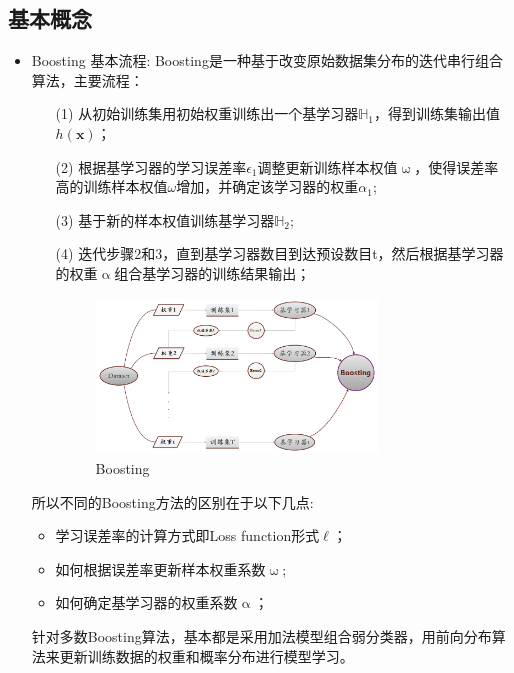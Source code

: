 \documentclass[a4paper]{article}
\begin{document}
	\subsection{基本概念}
	\begin{itemize}
		\item Boosting 基本流程:
		Boosting是一种基于改变原始数据集分布的迭代串行组合算法，主要流程：
			\begin{itemize}
				\item[(1)]	从初始训练集用初始权重训练出一个基学习器$\mathbb{H}_1$，得到训练集输出值$h(\textbf{x})$；
				\item[(2)]	根据基学习器的学习误差率$\epsilon_1$调整更新训练样本权值$\upomega$，使得误差率高的训练样本权值$\omega$增加，并确定该学习器的权重$\alpha_1$;
				\item[(3)]	基于新的样本权值训练基学习器$\mathbb{H}_2$;
				\item[(4)]	迭代步骤2和3，直到基学习器数目到达预设数目t，然后根据基学习器的权重$\upalpha$组合基学习器的训练结果输出；
				\begin{figure}[h]
					\centering
					\includegraphics[width=0.75\textwidth]{Dataset.png}
					\caption{Boosting}
				\end{figure}
			\end{itemize}
			所以不同的Boosting方法的区别在于以下几点:
			\begin{itemize}
				\item 学习误差率的计算方式即Loss function形式$\ell$；
				\item 如何根据误差率更新样本权重系数$\upomega$;
				\item 如何确定基学习器的权重系数$\upalpha$；
			\end{itemize}
			针对多数Boosting算法，基本都是采用加法模型组合弱分类器，用前向分布算法来更新训练数据的权重和概率分布进行模型学习。


\end{itemize}
\end{document}
